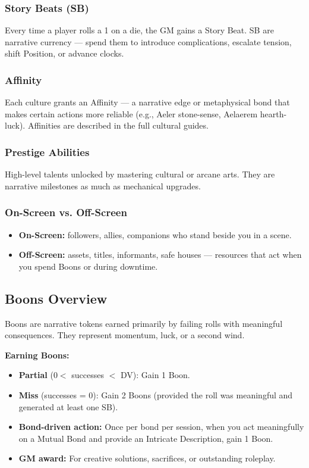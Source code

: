 \subsubsection{Story Beats (SB)}
Every time a player rolls a 1 on a die, the GM gains a Story Beat. SB are narrative currency — spend them to introduce complications, escalate tension, shift Position, or advance clocks.

\subsubsection{Affinity}
Each culture grants an Affinity — a narrative edge or metaphysical bond that makes certain actions more reliable (e.g., Aeler stone-sense, Aelaerem hearth-luck). Affinities are described in the full cultural guides.

\subsubsection{Prestige Abilities}
High-level talents unlocked by mastering cultural or arcane arts. They are narrative milestones as much as mechanical upgrades.

\subsubsection{On-Screen vs. Off-Screen}
\begin{itemize}
  \item \textbf{On-Screen:} followers, allies, companions who stand beside you in a scene.
  \item \textbf{Off-Screen:} assets, titles, informants, safe houses — resources that act when you spend Boons or during downtime.
\end{itemize}

\subsection{Boons Overview}

Boons are narrative tokens earned primarily by failing rolls with meaningful consequences. They represent momentum, luck, or a second wind.

\textbf{Earning Boons:}
\begin{itemize}
  \item \textbf{Partial} ($0 <$ successes $<$ DV): Gain 1 Boon.
  \item \textbf{Miss} (successes = 0): Gain 2 Boons (provided the roll was meaningful and generated at least one SB).
  \item \textbf{Bond-driven action:} Once per bond per session, when you act meaningfully on a Mutual Bond and provide an Intricate Description, gain 1 Boon.
  \item \textbf{GM award:} For creative solutions, sacrifices, or outstanding roleplay.
\end{itemize}

